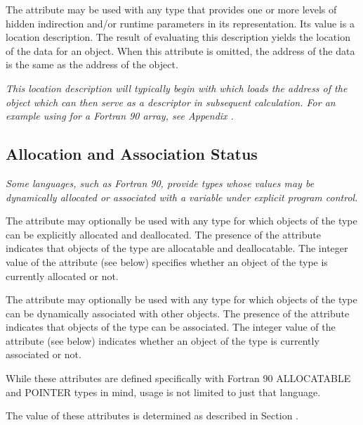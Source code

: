 The  attribute may be used with any
type that provides one or more levels of hidden indirection
and/or run\dash time parameters in its representation. Its value
is a location description. The result of evaluating this
description yields the location of the data for an object.
When this attribute is omitted, the address of the data is
the same as the address of the object.

\textit{This location description will typically begin with
 which loads the address of the
object which can then serve as a descriptor in subsequent
calculation. For an example using  for a
Fortran 90 array, see 
Appendix .}

\subsection{Allocation and Association Status}
\label{chap:allocationandassociationstatus}

\textit{Some languages, such as Fortran 90, provide types whose values
may be dynamically allocated or associated with a variable
under explicit program control.}

The  attribute may optionally be used with any
type for which objects of the type can be explicitly allocated
and deallocated. The presence of the attribute indicates that
objects of the type are allocatable and deallocatable. The
integer value of the attribute (see below) specifies whether
an object of the type is currently allocated or not.

The  attribute may optionally be used with
any type for which objects of the type can be dynamically
associated with other objects. The presence of the attribute
indicates that objects of the type can be associated. The
integer value of the attribute (see below) indicates whether
an object of the type is currently associated or not.

While these attributes are defined specifically with Fortran
90 ALLOCATABLE and POINTER types in mind, usage is not limited
to just that language.

The value of these attributes is determined as described in
Section .

